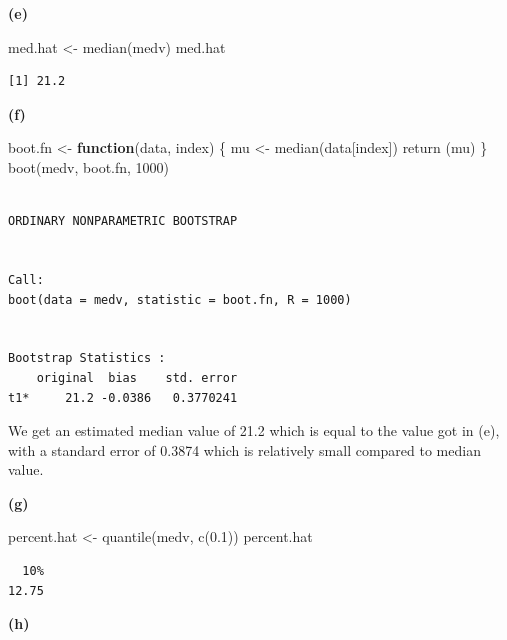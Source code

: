 \documentclass[
  letterpaper,
  DIV=11,
  numbers=noendperiod]{scrartcl}
\newenvironment{Shaded}{\begin{snugshade}}{\end{snugshade}}
\newcommand{\ControlFlowTok}[1]{\textcolor[rgb]{0.00,0.23,0.31}{\textbf{#1}}}
\newcommand{\DecValTok}[1]{\textcolor[rgb]{0.68,0.00,0.00}{#1}}
\newcommand{\FloatTok}[1]{\textcolor[rgb]{0.68,0.00,0.00}{#1}}
\newcommand{\FunctionTok}[1]{\textcolor[rgb]{0.28,0.35,0.67}{#1}}
\newcommand{\NormalTok}[1]{\textcolor[rgb]{0.00,0.23,0.31}{#1}}
\newcommand{\OtherTok}[1]{\textcolor[rgb]{0.00,0.23,0.31}{#1}}
\begin{document}
\textbf{(e)}

\begin{Shaded}
\begin{Highlighting}[]
\NormalTok{med.hat }\OtherTok{\textless{}{-}} \FunctionTok{median}\NormalTok{(medv)}
\NormalTok{med.hat}
\end{Highlighting}
\end{Shaded}

\begin{verbatim}
[1] 21.2
\end{verbatim}

\textbf{(f)}

\begin{Shaded}
\begin{Highlighting}[]
\NormalTok{boot.fn }\OtherTok{\textless{}{-}} \ControlFlowTok{function}\NormalTok{(data, index) \{}
\NormalTok{    mu }\OtherTok{\textless{}{-}} \FunctionTok{median}\NormalTok{(data[index])}
    \FunctionTok{return}\NormalTok{ (mu)}
\NormalTok{\}}
\FunctionTok{boot}\NormalTok{(medv, boot.fn, }\DecValTok{1000}\NormalTok{)}
\end{Highlighting}
\end{Shaded}

\begin{verbatim}

ORDINARY NONPARAMETRIC BOOTSTRAP


Call:
boot(data = medv, statistic = boot.fn, R = 1000)


Bootstrap Statistics :
    original  bias    std. error
t1*     21.2 -0.0386   0.3770241
\end{verbatim}

We get an estimated median value of 21.2 which is equal to the value got
in (e), with a standard error of 0.3874 which is relatively small
compared to median value.

\textbf{(g)}

\begin{Shaded}
\begin{Highlighting}[]
\NormalTok{percent.hat }\OtherTok{\textless{}{-}} \FunctionTok{quantile}\NormalTok{(medv, }\FunctionTok{c}\NormalTok{(}\FloatTok{0.1}\NormalTok{))}
\NormalTok{percent.hat}
\end{Highlighting}
\end{Shaded}

\begin{verbatim}
  10% 
12.75 
\end{verbatim}

\textbf{(h)}
\end{document}
